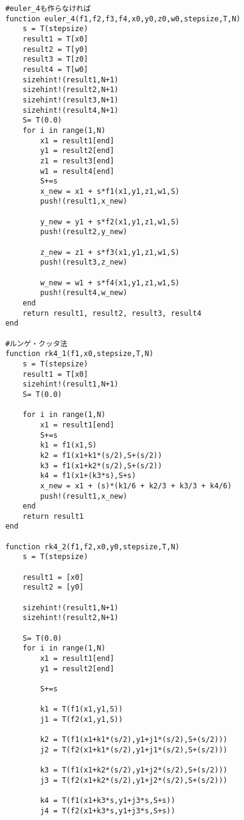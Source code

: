 \begin{lstlisting}
    #euler_4も作らなければ
    function euler_4(f1,f2,f3,f4,x0,y0,z0,w0,stepsize,T,N)
        s = T(stepsize)
        result1 = T[x0]
        result2 = T[y0]
        result3 = T[z0] 
        result4 = T[w0]
        sizehint!(result1,N+1)
        sizehint!(result2,N+1)
        sizehint!(result3,N+1)
        sizehint!(result4,N+1)
        S= T(0.0)
        for i in range(1,N)
            x1 = result1[end]
            y1 = result2[end]
            z1 = result3[end]
            w1 = result4[end]
            S+=s
            x_new = x1 + s*f1(x1,y1,z1,w1,S)
            push!(result1,x_new)

            y_new = y1 + s*f2(x1,y1,z1,w1,S)
            push!(result2,y_new)

            z_new = z1 + s*f3(x1,y1,z1,w1,S)
            push!(result3,z_new)

            w_new = w1 + s*f4(x1,y1,z1,w1,S)
            push!(result4,w_new)
        end
        return result1, result2, result3, result4
    end

    #ルンゲ・クッタ法
    function rk4_1(f1,x0,stepsize,T,N)
        s = T(stepsize)
        result1 = T[x0]
        sizehint!(result1,N+1)
        S= T(0.0)

        for i in range(1,N)
            x1 = result1[end]
            S+=s
            k1 = f1(x1,S)
            k2 = f1(x1+k1*(s/2),S+(s/2))
            k3 = f1(x1+k2*(s/2),S+(s/2))
            k4 = f1(x1+(k3*s),S+s)
            x_new = x1 + (s)*(k1/6 + k2/3 + k3/3 + k4/6)
            push!(result1,x_new)
        end
        return result1
    end

    function rk4_2(f1,f2,x0,y0,stepsize,T,N)
        s = T(stepsize)

        result1 = [x0]
        result2 = [y0]

        sizehint!(result1,N+1)
        sizehint!(result2,N+1)

        S= T(0.0)
        for i in range(1,N)
            x1 = result1[end]
            y1 = result2[end]

            S+=s

            k1 = T(f1(x1,y1,S))
            j1 = T(f2(x1,y1,S))

            k2 = T(f1(x1+k1*(s/2),y1+j1*(s/2),S+(s/2)))
            j2 = T(f2(x1+k1*(s/2),y1+j1*(s/2),S+(s/2)))

            k3 = T(f1(x1+k2*(s/2),y1+j2*(s/2),S+(s/2)))
            j3 = T(f2(x1+k2*(s/2),y1+j2*(s/2),S+(s/2)))

            k4 = T(f1(x1+k3*s,y1+j3*s,S+s))
            j4 = T(f2(x1+k3*s,y1+j3*s,S+s))


\end{lstlisting}
